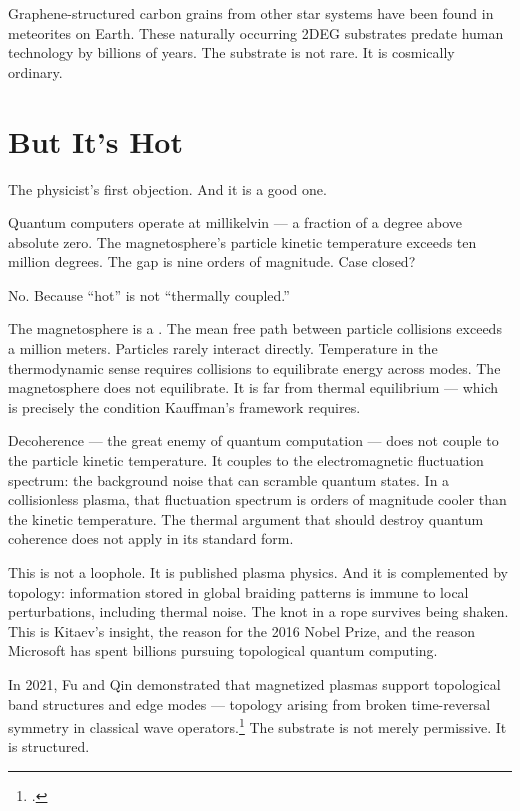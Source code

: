 Graphene-structured carbon grains from other star systems have been found in meteorites on Earth. These naturally occurring 2DEG substrates predate human technology by billions of years. The substrate is not rare. It is cosmically ordinary.

\section*{But It's Hot}
\label{spine:ws-but-its-hot}

The physicist's first objection. And it is a good one.

Quantum computers operate at millikelvin --- a fraction of a degree above absolute zero. The magnetosphere's particle kinetic temperature exceeds ten million degrees. The gap is nine orders of magnitude. Case closed?

No. Because ``hot'' is not ``thermally coupled.''

The magnetosphere is a . The mean free path between particle collisions exceeds a million meters. Particles rarely interact directly. Temperature in the thermodynamic sense requires collisions to equilibrate energy across modes. The magnetosphere does not equilibrate. It is far from thermal equilibrium --- which is precisely the condition Kauffman's framework requires.

Decoherence --- the great enemy of quantum computation --- does not couple to the particle kinetic temperature. It couples to the electromagnetic fluctuation spectrum: the background noise that can scramble quantum states. In a collisionless plasma, that fluctuation spectrum is orders of magnitude cooler than the kinetic temperature. The thermal argument that should destroy quantum coherence does not apply in its standard form.

This is not a loophole. It is published plasma physics. And it is complemented by topology: information stored in global braiding patterns is immune to local perturbations, including thermal noise. The knot in a rope survives being shaken. This is Kitaev's insight, the reason for the 2016 Nobel Prize, and the reason Microsoft has spent billions pursuing topological quantum computing.

In 2021, Fu and Qin demonstrated that magnetized plasmas support topological band structures and edge modes --- topology arising from broken time-reversal symmetry in classical wave operators.\footcite{fu2021} The substrate is not merely permissive. It is structured.

